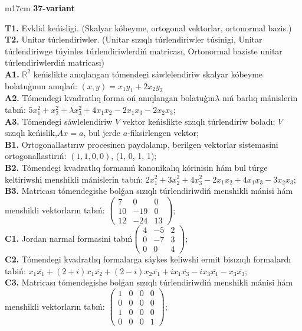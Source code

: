 \documentclass{article}
\begin{document}
\begin{tabular}{m{17cm}}
\textbf{37-variant}
\newline

\textbf{T1.} Evklid keńisligi. (Skalyar kóbeyme, ortogonal vektorlar, ortonormal bazis.) \\
\textbf{T2.} Unitar túrlendiriwler. (Unitar sızıqlı túrlendiriwler túsinigi,  Unitar túrlendiriwge túyinles túrlendiriwlerdiń matricası,   Ortonormal baziste unitar túrlendiriwlerdiń matricası) \\
\textbf{A1.} \(\mathbb{R}^{2}\) keńislikte anıqlangan tómendegi sáwlelendiriw skalyar kóbeyme bolatuģının anıqlań: \((x,y) = x_{1}y_{1} + 2x_{2}y_{2}\) \\
\textbf{A2.} Tómendegi kvadratlıq forma oń anıqlangan bolatuģın\(\lambda\) nıń barlıq mánislerin tabıń: \(5x_{1}^{2} + x_{2}^{2} + \lambda x_{3}^{2} + 4x_{1}x_{2} - 2x_{1}x_{3} - 2x_{2}x_{3}\); \\
\textbf{A3.} Tómendegi sáwlelendiriw \(V\) vektor keńislikte sızıqlı túrlendiriw boladı: \(V\) sızıqlı keńislik,\(Ax = a\), bul jerde \(a\)-fiksirlengen vektor; \\
\textbf{B1.} Ortogonallastırıw procesinen paydalanıp, berilgen vektorlar sistemasini ortogonallastirıń: \((1,1,0,0)\), (1, 0, 1, 1); \\
\textbf{B2.} Tómendegi kvadratlıq formanıń kanonikalıq kórinisin hám bul túrge keltiriwshi menshikli mánislerin tabıń: \(2x_{1}^{2} + 3x_{2}^{2} + 4x_{3}^{2} - 2x_{1}x_{2} + 4x_{1}x_{3} - 3x_{2}x_{3}\); \\
\textbf{B3.} Matricası tómendegishe bolǵan sızıqlı túrlendiriwdiń menshikli mánisi hám menshikli vektorların tabıń: \(\begin{pmatrix} 7 & 0 & 0 \\ 10 & - 19 & 0 \\ 12 & - 24 & 13 \end{pmatrix}\); \\
\textbf{C1.} Jordan narmal formasini tabıń\(\begin{pmatrix} 4 & - 5 & 2 \\ 0 & - 7 & 3 \\ 0 & 0 & 4 \end{pmatrix}\); \\
\textbf{C2.} Tómendegi kvadratlıq formalarga sáykes keliwshi ermit bisızıqlı formalardı tabiń: \(x_{1}\overline{x_{1}} + (2 + i)x_{1}\overline{x_{2}} + (2 - i)x_{2}\overline{x_{1}} + ix_{1}\overline{x_{3}} - ix_{3}\overline{x_{1}} - x_{3}\overline{x_{3}}\); \\
\textbf{C3.} Matricası tómendegishe bolǵan sızıqlı túrlendiriwdiń menshikli mánisi hám menshikli vektorların tabıń: \(\begin{pmatrix} 1 & 0 & 0 & 0 \\ 0 & 0 & 0 & 0 \\ 1 & 0 & 0 & 0 \\ 0 & 0 & 0 & 1 \end{pmatrix}\); \\

\end{tabular}
\vspace{1cm}
\end{document}
